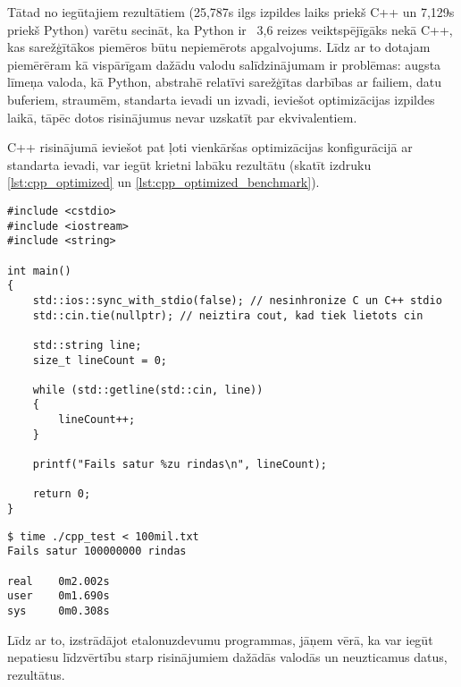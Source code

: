 Tātad no iegūtajiem rezultātiem (25,787s ilgs izpildes laiks priekš C++ un
7,129s priekš Python) varētu secināt, ka Python ir ~3,6 reizes veiktspējīgāks
nekā C++, kas sarežģītākos piemēros būtu nepiemērots apgalvojums. Līdz ar to
dotajam piemērēram kā vispārīgam dažādu valodu salīdzinājumam ir problēmas:
augsta līmeņa valoda, kā Python, abstrahē relatīvi sarežģītas darbības ar
failiem, datu buferiem, straumēm, standarta ievadi un izvadi, ieviešot
optimizācijas izpildes laikā, tāpēc dotos risinājumus nevar uzskatīt par
ekvivalentiem.

C++ risinājumā ieviešot pat ļoti vienkāršas optimizācijas konfigurācijā ar
standarta ievadi, var iegūt krietni labāku rezultātu (skatīt izdruku
\ref{lst:cpp_optimized} un \ref{lst:cpp_optimized_benchmark}).

\begin{lstlisting}[caption={Optimizēta vienkārša faila apstrāde valodā C++ caur standarta ievadi },
  label=lst:cpp_optimized,
  captionpos=b
]
#include <cstdio>
#include <iostream>
#include <string>

int main()
{
    std::ios::sync_with_stdio(false); // nesinhronize C un C++ stdio 
    std::cin.tie(nullptr); // neiztira cout, kad tiek lietots cin

    std::string line;
    size_t lineCount = 0;

    while (std::getline(std::cin, line))
    {
        lineCount++;
    }

    printf("Fails satur %zu rindas\n", lineCount);

    return 0;
}
\end{lstlisting}


\begin{lstlisting}[caption={Optimizētā C++ etalonuzdevuma rezultāti failam ar 100 miljoniem rindu},
  label=lst:cpp_optimized_benchmark,
  captionpos=b
]
$ time ./cpp_test < 100mil.txt 
Fails satur 100000000 rindas 

real    0m2.002s
user    0m1.690s
sys     0m0.308s
\end{lstlisting}

Līdz ar to, izstrādājot etalonuzdevumu programmas, jāņem vērā, ka var iegūt
nepatiesu līdzvērtību starp risinājumiem dažādās valodās un neuzticamus datus,
rezultātus.

